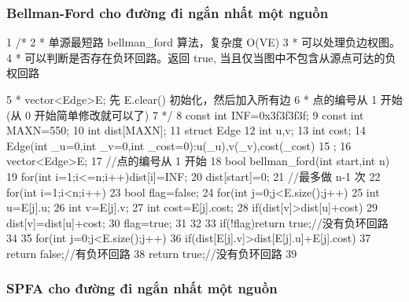 \documentclass[11pt]{article}
\begin{document}
\subsubsection{Bellman-Ford cho đường đi ngắn nhất một nguồn}

\begin{Code}
1 /*
2 * 单源最短路 bellman_ford 算法，复杂度 O(VE)
3 * 可以处理负边权图。
4 * 可以判断是否存在负环回路。返回 true, 当且仅当图中不包含从源点可达的负权回路


 5    * vector<Edge>E; 先 E.clear() 初始化，然后加入所有边
 6    * 点的编号从 1 开始 (从 0 开始简单修改就可以了)
 7    */
 8   const int INF=0x3f3f3f3f;
 9   const int MAXN=550;
10   int dist[MAXN];
11   struct Edge{
12       int u,v;
13       int cost;
14       Edge(int _u=0,int _v=0,int _cost=0):u(_u),v(_v),cost(_cost){}
15   };
16   vector<Edge>E;
17   //点的编号从 1 开始
18   bool bellman_ford(int start,int n){
19       for(int i=1;i<=n;i++)dist[i]=INF;
20       dist[start]=0;
21       //最多做 n-1 次
22       for(int i=1;i<n;i++){
23           bool flag=false;
24           for(int j=0;j<E.size();j++){
25                int u=E[j].u;
26                int v=E[j].v;
27                int cost=E[j].cost;
28                if(dist[v]>dist[u]+cost){
29                    dist[v]=dist[u]+cost;
30                    flag=true;
31                }
32           }
33           if(!flag)return true;//没有负环回路
34       }
35       for(int j=0;j<E.size();j++)
36           if(dist[E[j].v]>dist[E[j].u]+E[j].cost)
37                return false;//有负环回路
38       return true;//没有负环回路
39   }
\end{Code}

\subsubsection{SPFA cho đường đi ngắn nhất một nguồn}
\end{document}
